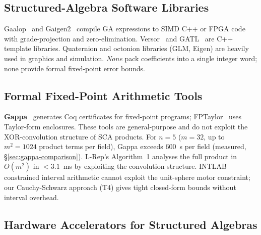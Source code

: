 \documentclass[11pt,a4paper]{article}
\theoremstyle{definition}
\theoremstyle{plain}
\theoremstyle{remark}
\begin{document}
\subsection{Structured-Algebra Software Libraries}

Gaalop~\cite{gaalop} and Gaigen2~\cite{fontijne2007} compile GA expressions
to SIMD C++ or FPGA code with grade-projection and zero-elimination.
Versor~\cite{versor} and GATL~\cite{gatl} are C++ template libraries.
Quaternion and octonion libraries (GLM, Eigen) are heavily used in graphics
and simulation.
\emph{None} pack coefficients into a single integer word; none provide
formal fixed-point error bounds.

\subsection{Formal Fixed-Point Arithmetic Tools}

\textbf{Gappa}~\cite{gappa} generates Coq certificates for fixed-point
programs; FPTaylor~\cite{fptaylor} uses Taylor-form enclosures.
These tools are general-purpose and do not exploit the XOR-convolution
structure of SCA products.
For $n=5$ ($m=32$, up to $m^2=1024$ product terms per field), Gappa
exceeds 600~s per field (measured, \S\ref{sec:gappa-comparison}).
L-Rep's Algorithm~1 analyses the full product in $O(m^2)$ in $<3.1$~ms
by exploiting the convolution structure.
INTLAB~\cite{rump1999} constrained interval arithmetic cannot exploit
the unit-sphere motor constraint; our Cauchy-Schwarz approach (T4) gives
tight closed-form bounds without interval overhead.

\subsection{Hardware Accelerators for Structured Algebras}
\end{document}
